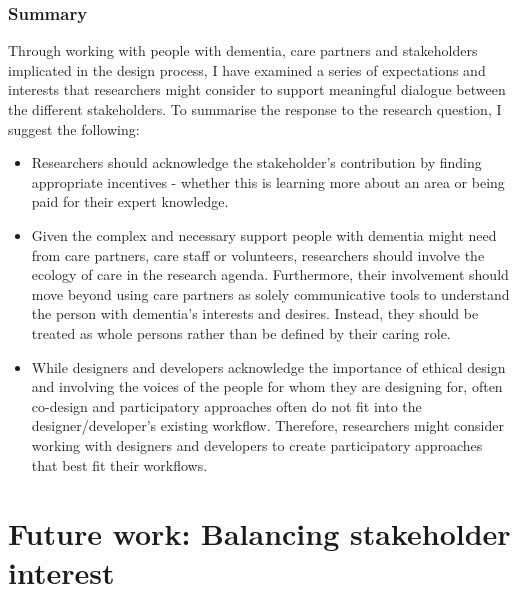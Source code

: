 \subsubsection{Summary}
\label{RQ3-summary}
Through working with people with dementia, care partners and stakeholders implicated in the design process, I have examined a series of expectations and interests that researchers might consider to support meaningful dialogue between the different stakeholders. To summarise the response to the research question, I  suggest the following:
\begin{itemize}
    \item Researchers should acknowledge the stakeholder's contribution by finding appropriate incentives - whether this is learning more about an area or being paid for their expert knowledge.
    \item Given the complex and necessary support people with dementia might need from care partners, care staff or volunteers, researchers should involve the ecology of care in the research agenda. Furthermore, their involvement should move beyond using care partners as solely communicative tools to understand the person with dementia's interests and desires. Instead, they should be treated as whole persons rather than be defined by their caring role.
    \item While designers and developers acknowledge the importance of ethical design and involving the voices of the people for whom they are designing for, often co-design and participatory approaches often do not fit into the designer/developer's existing workflow. Therefore, researchers might consider working with designers and developers to create participatory approaches that best fit their workflows.

\end{itemize}

\section{Future work: Balancing stakeholder interest}
\label{Discussion:Design}

